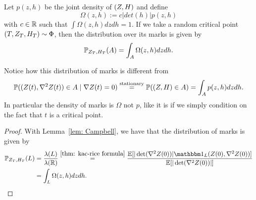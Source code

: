 \begin{corollary}
	\label{cor: mark distribution}
	Let \(p(z,h)\) be the joint density of \((Z, H)\) and define
	\[
		\Omega(z,h) := c |det(h)| p(z,h)
	\]
	with \(c\in\mathbb{R}\) such that \(\int \Omega(z,h)dz dh = 1\).
	If we take a random critical point \((T,Z_T,H_T)\sim \Phi\),
	then the distribution over its marks is given by
	\[
		\mathbb{P}_{Z_T,H_T}(A) = \int_A \Omega(z,h) dz dh.
	\]
\end{corollary}
\begin{remark}
	Notice how this distribution of marks is different from
	\[
		\mathbb{P}((Z(t),\nabla^2Z(t))\in A \mid \nabla Z(t) = 0)
		\overset{\text{stationary}}
		= \mathbb{P}((Z,H)\in A)
		= \int_A p(z,h)dz dh.
	\]
	In particular the density of marks is \(\Omega\) not \(p\), like it is if
	we simply condition on the fact that \(t\) is a critical point.
\end{remark}
\begin{proof}
	With Lemma~\ref{lem: Campbell}, we have that the distribution of marks is
	given by
	\begin{align*}
		\Pr_{\rf_T,H_T}(L)
		&= \frac{\lambda(L)}{\lambda(\real)}
		\overset{\ref{thm: kac-rice formula}}= \frac{
			\E[|\det(\nabla^2 \rf(0))|
			\ind_L(\rf(0), \nabla^2\rf(0))
			]
		}{
			\E[|\det(\nabla^2 \rf(0))|]
		}\\
		&= \int_L \Omega(z,h) dz dh.
		\qedhere
	\end{align*}
\end{proof}
